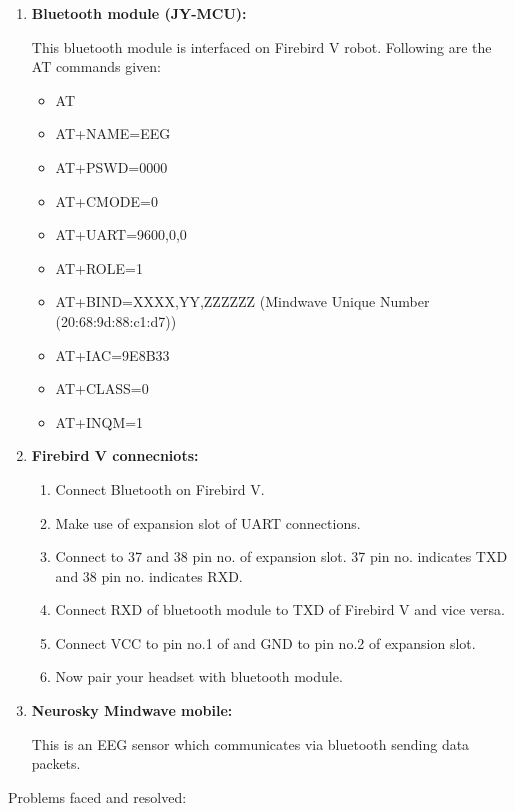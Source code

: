\documentclass[14pt]{article}
\begin{document}
\begin{enumerate}
	\item \textbf{{\large Bluetooth module (JY-MCU):}}


{\raggedright
This bluetooth module is interfaced on Firebird V robot. Following are the AT commands given:
}

\begin{itemize}
	\item AT
	\item AT+NAME=EEG
	\item AT+PSWD=0000
	\item AT+CMODE=0
	\item AT+UART=9600,0,0
	\item AT+ROLE=1
	\item AT+BIND=XXXX,YY,ZZZZZZ (Mindwave Unique Number (20:68:9d:88:c1:d7))
	\item AT+IAC=9E8B33
	\item AT+CLASS=0
	\item AT+INQM=1
\end{itemize}


	\item \textbf{{\large Firebird V connecniots:}}
	\begin{enumerate}
	\item Connect Bluetooth on Firebird V.
	\item Make use of expansion slot of UART connections.
	\item Connect to 37 and 38 pin no. of expansion slot. 37 pin no. indicates TXD and 38 pin no. indicates RXD.
	\item Connect RXD of bluetooth module to TXD of Firebird V and vice versa.
	\item Connect VCC to pin no.1 of and GND to pin no.2 of expansion slot.
	\item Now pair your headset with bluetooth module.
\end{enumerate}


	\item \textbf{{\large Neurosky Mindwave mobile:}}


This is an EEG sensor which communicates via bluetooth sending data packets.
\end{enumerate}

\break

\begin{center}
{\Huge Problems faced and resolved:}
\end{center}
\end{document}
